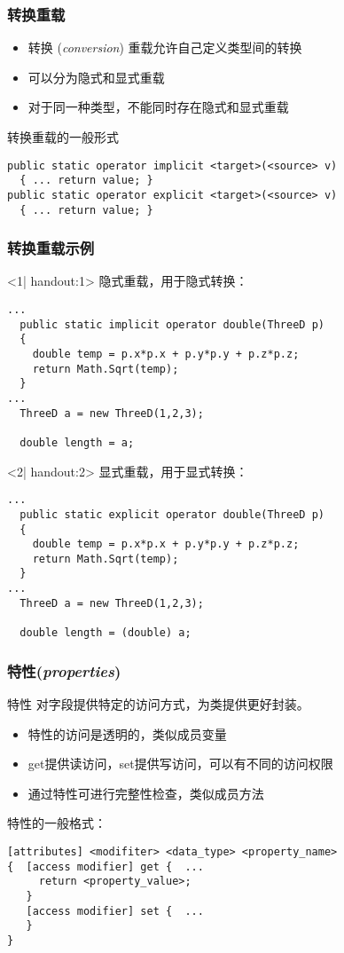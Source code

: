\begin{frame}[fragile]
\frametitle{转换重载}
\begin{itemize}
\item 转换 (\textit{conversion}) 重载允许自己定义类型间的转换
\item 可以分为隐式和显式重载
\item 对于同一种类型，不能同时存在隐式和显式重载
\end{itemize}
\pause
转换重载的一般形式
\begin{lstlisting}
public static operator implicit <target>(<source> v)
  { ... return value; }
public static operator explicit <target>(<source> v)
  { ... return value; }
\end{lstlisting}
\end{frame}

\begin{frame}[fragile]
\frametitle{转换重载示例}
\begin{onlyenv}<1| handout:1>
隐式重载，用于隐式转换：
\begin{lstlisting}
...
  public static implicit operator double(ThreeD p)
  {
    double temp = p.x*p.x + p.y*p.y + p.z*p.z;
    return Math.Sqrt(temp);
  }
...
  ThreeD a = new ThreeD(1,2,3);

  double length = a;

\end{lstlisting}
\end{onlyenv}
\begin{onlyenv}<2| handout:2>
显式重载，用于显式转换：
\begin{lstlisting}
...
  public static explicit operator double(ThreeD p)
  {
    double temp = p.x*p.x + p.y*p.y + p.z*p.z;
    return Math.Sqrt(temp);
  }
...
  ThreeD a = new ThreeD(1,2,3);

  double length = (double) a;

\end{lstlisting}
\end{onlyenv}
\end{frame}

\begin{frame}[fragile]
\frametitle{特性(\textit{properties})}
\begin{block}{特性}
\CJKindent 对字段提供特定的访问方式，为类提供更好封装。
\end{block}
\begin{itemize}
\item 特性的访问是透明的，类似成员变量
\item get提供读访问，set提供写访问，可以有不同的访问权限
\item 通过特性可进行完整性检查，类似成员方法
\end{itemize}
\pause
特性的一般格式：
\begin{lstlisting}
[attributes] <modifiter> <data_type> <property_name>
{  [access modifier] get {  ...
     return <property_value>;
   }
   [access modifier] set {  ...  
   }
}
\end{lstlisting}
\end{frame}

